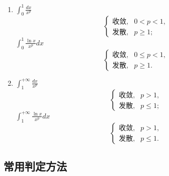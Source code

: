 \begin{enumerate}
    \item $\displaystyle \int_0^{1}\frac{dx}{x^{p}}$
          \[
              \begin{cases}
                  \text{收敛}, & 0<p<1,  \\
                  \text{发散}, & p\ge 1;
              \end{cases}
          \]
          \quad
          $\displaystyle \int_0^{1}\frac{\ln x}{x^{p}}dx$
          \[
              \begin{cases}
                  \text{收敛}, & 0\le p<1, \\
                  \text{发散}, & p\ge 1.
              \end{cases}
          \]

    \item $\displaystyle \int_1^{+\infty}\frac{dx}{x^{p}}$
          \[
              \begin{cases}
                  \text{收敛}, & p>1,    \\
                  \text{发散}, & p\le 1;
              \end{cases}
          \]
          \quad
          $\displaystyle \int_1^{+\infty}\frac{\ln x}{x^{p}}dx$
          \[
              \begin{cases}
                  \text{收敛}, & p>1,    \\
                  \text{发散}, & p\le 1.
              \end{cases}
          \]
\end{enumerate}

\subsection{常用判定方法}

